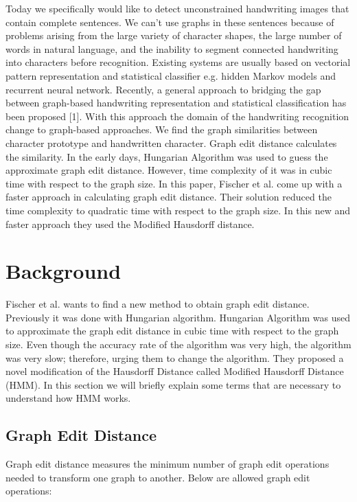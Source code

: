 \documentclass{article}
\begin{document}
 Today we specifically would like to detect unconstrained handwriting images that contain complete sentences. We can't use graphs in these sentences because of problems arising from the large variety of character shapes, the large number of words in natural language, and the inability to segment connected handwriting into characters before recognition. Existing systems are usually based on vectorial pattern representation and statistical classifier e.g. hidden Markov models and recurrent neural network. Recently, a general approach to bridging the gap between graph-based handwriting representation and statistical classification has been proposed [1]. With this approach the domain of the handwriting recognition change to graph-based approaches. We find the graph similarities between character prototype and handwritten character. Graph edit distance calculates the similarity. In the early days, Hungarian Algorithm was used to guess the approximate graph edit distance. However, time complexity of it was in cubic time with respect to the graph size. In this paper, Fischer et al. come up with a faster approach in calculating graph edit distance. Their solution reduced the time complexity to quadratic time with respect to the graph size. In this new and faster approach they used the Modified Hausdorff distance.
 

\section{Background}

Fischer et al. wants to find a new method to obtain graph edit distance. Previously it was done with Hungarian algorithm. Hungarian Algorithm was used to approximate the graph edit distance in cubic time with respect to the graph size. Even though the accuracy rate of the algorithm was very high, the algorithm was very slow; therefore, urging them to change the algorithm. They proposed a novel modification of the Hausdorff Distance called Modified Hausdorff Distance (HMM). In this section we will briefly explain some terms that are necessary to understand how HMM works.

\subsection{Graph Edit Distance}
Graph edit distance measures the minimum number of graph edit operations needed to transform one graph to another. Below are allowed graph edit operations:
\end{document}
